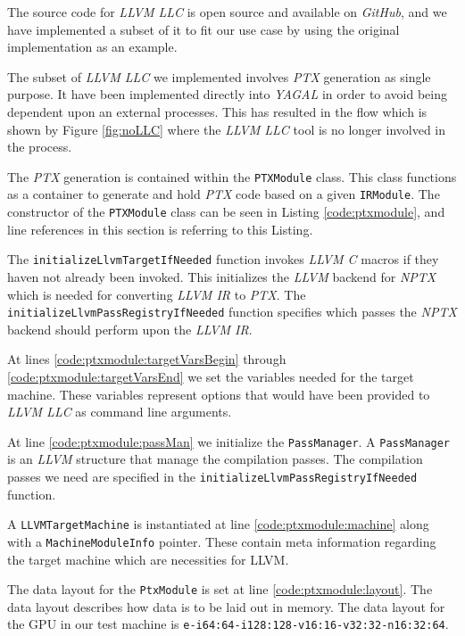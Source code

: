 The source code for \textit{LLVM LLC} is open source and available on \textit{GitHub}\cite{llvmGithub}, and we have implemented a subset of it to fit our use case by using the original implementation as an example.

The subset of \textit{LLVM LLC} we implemented involves \textit{PTX} generation as single purpose. It have been implemented directly into \textit{YAGAL} in order to avoid being dependent upon an external processes. This has resulted in the flow which is shown by Figure \ref{fig:noLLC} where the \textit{LLVM LLC} tool is no longer involved in the process.

The \textit{PTX} generation is contained within the \texttt{PTXModule} class. This class functions as a container to generate and hold \textit{PTX} code based on a given \texttt{IRModule}. The constructor of the \texttt{PTXModule} class can be seen in Listing \ref{code:ptxmodule}, and line references in this section is referring to this Listing. 

The \texttt{initializeLlvmTargetIfNeeded} function invokes \textit{LLVM C} macros if they haven not already been invoked. This initializes the \textit{LLVM} backend for \textit{NPTX} which is needed for converting \textit{LLVM IR} to \textit{PTX}. The \texttt{initializeLlvmPassRegistryIfNeeded} function specifies which passes the \textit{NPTX} backend should perform upon the \textit{LLVM IR}.

At lines \ref{code:ptxmodule:targetVarsBegin} through \ref{code:ptxmodule:targetVarsEnd} we set the variables needed for the target machine. These variables represent options that would have been provided to \textit{LLVM LLC} as command line arguments.

At line \ref{code:ptxmodule:passMan} we initialize the \texttt{PassManager}. A \texttt{PassManager} is an \textit{LLVM} structure that manage the compilation passes. The compilation passes we need are specified in the \texttt{initializeLlvmPassRegistryIfNeeded} function.


A \texttt{LLVMTargetMachine} is instantiated at line \ref{code:ptxmodule:machine} along with a \texttt{MachineModuleInfo} pointer. These contain meta information regarding the target machine which are necessities for LLVM.

The data layout for the \texttt{PtxModule} is set at line \ref{code:ptxmodule:layout}. The data layout describes how data is to be laid out in memory. The data layout for the GPU in our test machine is \texttt{e-i64:64-i128:128-v16:16-v32:32-n16:32:64}.

